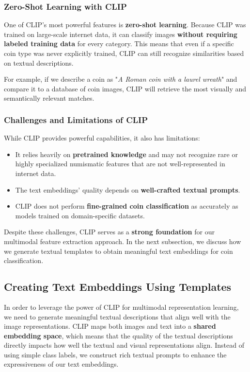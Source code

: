 \documentclass[nolibertine, english, algorithm, nomencl, minted]{ttlab-qualify}
\begin{document}
\subsubsection{Zero-Shot Learning with CLIP}

One of CLIP’s most powerful features is \textbf{zero-shot learning}. 
Because CLIP was trained on large-scale internet data, it can classify images \textbf{without requiring labeled training data}
for every category. This means that even if a specific coin type was never explicitly trained, 
CLIP can still recognize similarities based on textual descriptions.

For example, if we describe a coin as "\textit{A Roman coin with a laurel wreath}" and compare it to a 
database of coin images, CLIP will retrieve the most visually and semantically relevant matches.

\subsubsection{Challenges and Limitations of CLIP}

While CLIP provides powerful capabilities, it also has limitations:
\begin{itemize}
    \item It relies heavily on \textbf{pretrained knowledge} and may not recognize rare or highly specialized 
    numismatic features that are not well-represented in internet data.
    \item The text embeddings' quality depends on \textbf{well-crafted textual prompts}.
    \item CLIP does not perform \textbf{fine-grained coin classification} as accurately as models trained on domain-specific datasets.
\end{itemize}

Despite these challenges, CLIP serves as a \textbf{strong foundation} for our multimodal feature extraction approach. 
In the next subsection, we discuss how we generate textual templates to obtain meaningful text embeddings for coin classification.


\subsection{Creating Text Embeddings Using Templates}

In order to leverage the power of CLIP for multimodal representation learning, we need to generate meaningful 
textual descriptions that align well with the image representations. 
CLIP maps both images and text into a \textbf{shared embedding space}, which means that the quality of the textual descriptions 
directly impacts how well the textual and visual representations align. 
Instead of using simple class labels, we construct rich textual prompts to enhance the expressiveness of our text embeddings.
\end{document}
